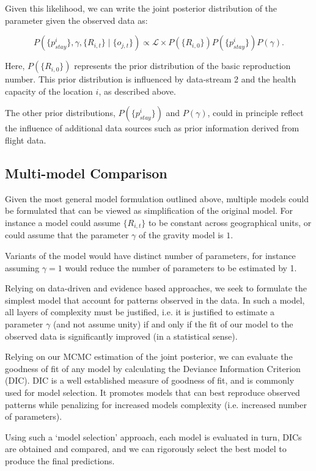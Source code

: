\documentclass[11pt,]{article}
\begin{document}
Given this likelihood, we can write the joint posterior distribution of the parameter given the observed data as:

\[
P( \{p_{stay}^i\}, \gamma, \{R_{i, t}\} \mid \{o_{j, t}\}) \propto  
  \mathcal{L} \times P(\{R_{i,0}\}) P(\{p_{stay}^i\}) P(\gamma).
\]

Here, $P(\{R_{i,0}\})$ represents the prior distribution of the basic reproduction number. This prior distribution is 
influenced by data-stream 2 and the health capacity of the location $i$, as described above.

The other prior distributions,  $P(\{p_{stay}^i\})$ and $P(\gamma)$, could in principle reflect the influence of 
additional data sources such as prior information derived from flight data. 

\subsection{Multi-model Comparison}

Given the most general model formulation outlined above, multiple models could be formulated that can be 
viewed as simplification of the original model. For instance a model
could assume  $\{R_{i, t}\}$ to be constant across geographical units, 
or could assume that the parameter $\gamma$ of the gravity model is $1$.

Variants of the model would have distinct number of parameters, for instance assuming $\gamma =1$ would reduce the number
of parameters to be estimated by 1. 

Relying on data-driven and evidence based approaches, we seek to formulate the 
simplest model that account for patterns observed in the data. In such a model, all layers of complexity must be justified, i.e.
it is justified to estimate a parameter $\gamma$ (and not assume unity) if and only if the fit of our model to the observed 
data is significantly improved (in a statistical sense).

Relying on our MCMC estimation of the joint posterior, we can evaluate the goodness of fit of any model by calculating
the Deviance Information Criterion (DIC). DIC is a well established
measure of goodness of fit, and is commonly used for model
selection. It promotes models that can best reproduce observed
patterns while penalizing for increased models complexity (i.e. increased number of parameters).

Using such a `model selection' approach, each model is evaluated in turn, DICs are obtained and compared, and
we can rigorously select the best model to produce the final predictions.
\end{document}
